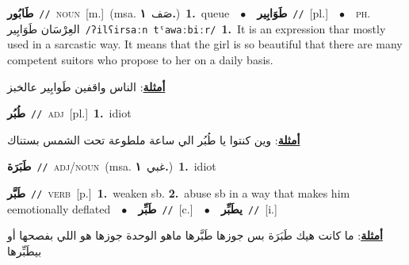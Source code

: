 \documentclass[10pt,a4paper,twoside]{article} %
\begin{document}
\begin{multicols}{2}
{\setlength\topsep{0pt}\textbf{\foreignlanguage{arabic}{طَابُور}}\ {\color{gray}\texttt{//}\color{black}}\ \textsc{noun}\ [m.]\ \color{gray}(msa. \foreignlanguage{arabic}{صَف}~\foreignlanguage{arabic}{\textbf{١.}})\color{black}\ \textbf{1.}~queue\ \ $\bullet$\ \ \setlength\topsep{0pt}\textbf{\foreignlanguage{arabic}{طَوَابِير}}\ {\color{gray}\texttt{//}\color{black}}\ [pl.]\ \ $\bullet$\ \ \textsc{ph.} \color{gray} \foreignlanguage{arabic}{العِرْسَان طَوَابِير}\color{black}\ {\color{gray}\texttt{/{\sffamily ʔilʕirsaːn tˤawaːbiːr}/}\color{black}}\ \textbf{1.}~It is an expression thar mostly used in a sarcastic way. It means that the girl is so beautiful that there are many competent suitors who propose to her on a daily basis.\  \begin{flushright}\color{gray}\foreignlanguage{arabic}{\textbf{\underline{\foreignlanguage{arabic}{أمثلة}}}: الناس واقفين طَوابِير عالخبز}\end{flushright}\color{black}} \vspace{2mm}

{\setlength\topsep{0pt}\textbf{\foreignlanguage{arabic}{طُبُر}}\ {\color{gray}\texttt{//}\color{black}}\ \textsc{adj}\ [pl.]\ \textbf{1.}~idiot\  \begin{flushright}\color{gray}\foreignlanguage{arabic}{\textbf{\underline{\foreignlanguage{arabic}{أمثلة}}}: وين كنتوا يا طُبُر الي ساعة ملطوعة تحت الشمس بستناك}\end{flushright}\color{black}} \vspace{2mm}

{\setlength\topsep{0pt}\textbf{\foreignlanguage{arabic}{طَبَرَة}}\ {\color{gray}\texttt{//}\color{black}}\ \textsc{adj/noun}\ \color{gray}(msa. \foreignlanguage{arabic}{غبي}~\foreignlanguage{arabic}{\textbf{١.}})\color{black}\ \textbf{1.}~idiot\ } \vspace{2mm}

{\setlength\topsep{0pt}\textbf{\foreignlanguage{arabic}{طَبَّر}}\ {\color{gray}\texttt{//}\color{black}}\ \textsc{verb}\ [p.]\ \textbf{1.}~weaken sb.  \textbf{2.}~abuse sb in a way that makes him eemotionally deflated\ \ $\bullet$\ \ \setlength\topsep{0pt}\textbf{\foreignlanguage{arabic}{طَبِّر}}\ {\color{gray}\texttt{//}\color{black}}\ [c.]\ \ $\bullet$\ \ \setlength\topsep{0pt}\textbf{\foreignlanguage{arabic}{يطَبِّر}}\ {\color{gray}\texttt{//}\color{black}}\ [i.]\  \begin{flushright}\color{gray}\foreignlanguage{arabic}{\textbf{\underline{\foreignlanguage{arabic}{أمثلة}}}: ما كانت هيك طَبَرَة بس جوزها طَبَّرها ماهو الوحدة جوزها هو اللي بفصحها أو بيطَبِّرها}\end{flushright}\color{black}} \vspace{2mm}


\end{multicols}
\end{document}
